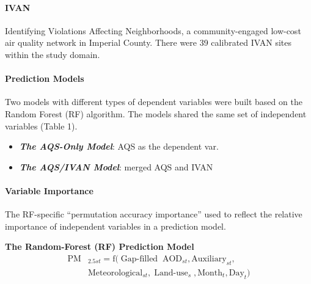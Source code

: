 \documentclass[a0paper,portrait]{baposter}
\begin{document}
\begin{poster}
{\vspace*{-\baselineskip}

\paragraph{IVAN} Identifying Violations Affecting Neighborhoods, a community-engaged low-cost air quality network in Imperial County. There were 39 calibrated IVAN sites within the study domain. 

\vspace*{-0.3\baselineskip}
\hdashrule{\textwidth}{0.1pt}{0.6mm 0.6mm}
\vspace*{-2\baselineskip}

\paragraph{Prediction Models} Two models with different types of dependent variables were built based on the Random Forest (RF) algorithm. The models shared the same set of independent variables (Table 1).
\begin{itemize}
    \item \textbf{\emph{The AQS-Only Model}}: AQS as the dependent var.
    \item \textbf{\emph{The AQS/IVAN Model}}: merged AQS and IVAN
\end{itemize}

\vspace*{-\baselineskip}

\paragraph{Variable Importance} The RF-specific ``permutation accuracy importance'' used to reflect the relative importance of independent variables in a prediction model. 

\begin{tcolorbox}[boxsep=0pt,left=3pt,right=3pt]
\centering\textbf{The Random-Forest (RF) Prediction Model}
\linespread{0.4}\selectfont
\begin{align*}
    \mathrm{PM}&\mathrm{_{2.5\mathit{st}}=f(\operatorname{Gap-filled}\;AOD_{\mathit{st}}, Auxiliary_{\mathit{st}}},\\
    &\mathrm{Meteorological_{\mathit{st}},\operatorname{Land-use}_\mathit{s},Month_\mathit{t}, Day_\mathit{t})}
\end{align*}
\end{tcolorbox}

\vspace*{-\baselineskip}

}
\end{poster}
\end{document}
